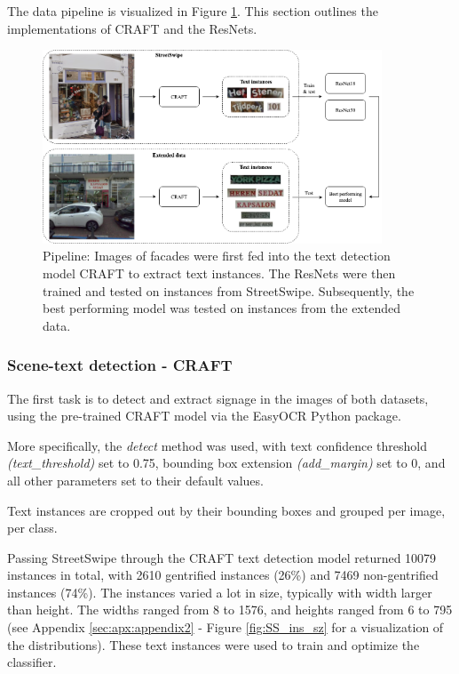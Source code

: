 The data pipeline is visualized in Figure \ref{fig:pipeline}. This section outlines the implementations of CRAFT and the ResNets.

\begin{figure}
    \centering
    \includegraphics[width=0.9\textwidth]{media/methodology/Pipeline.png}
    \caption{Pipeline: Images of facades were first fed into the text detection model CRAFT to extract text instances. The ResNets were then trained and tested on instances from StreetSwipe. Subsequently, the best performing model was tested on instances from the extended data.}
    \label{fig:pipeline}
\end{figure}


\subsubsection{Scene-text detection - CRAFT}

The first task is to detect and extract signage in the images of both datasets, using the pre-trained CRAFT model via the EasyOCR Python package.

More specifically, the \textit{detect} method was used, with text confidence threshold \textit{(text\_threshold)} set to 0.75, bounding box extension \textit{(add\_margin)} set to 0, and all other parameters set to their default values.

Text instances are cropped out by their bounding boxes and grouped per image, per class. 

Passing StreetSwipe through the CRAFT text detection model returned 10079 instances in total, with 2610 gentrified instances (26\%) and 7469 non-gentrified instances (74\%). The instances varied a lot in size, typically with width larger than height. The widths ranged from 8 to 1576, and heights ranged from 6 to 795 (see Appendix \ref{sec:apx:appendix2} - Figure \ref{fig:SS_ins_sz} for a visualization of the distributions). These text instances were used to train and optimize the classifier.

